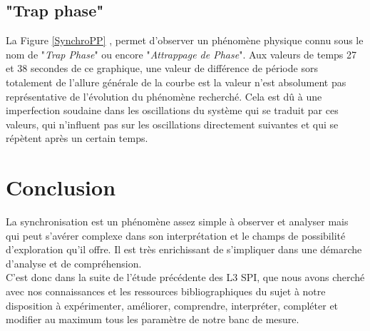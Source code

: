 \documentclass[a4paper,11pt]{report}
\begin{document}
\section{"Trap phase"}
La Figure \ref{SynchroPP} , permet d'observer un phénomène physique connu sous le nom de "{\it Trap Phase}" ou encore "{\it Attrappage de Phase}". Aux valeurs de temps 27 et 38 secondes de ce graphique, une valeur de différence de période sors totalement de l'allure générale de la courbe est la valeur n'est absolument pas représentative de l'évolution du phénomène recherché. Cela est dû à une imperfection soudaine dans les oscillations du système qui se traduit par ces valeurs, qui n'influent pas sur les oscillations directement suivantes et qui se répètent après un certain temps.
\newpage
\null
\thispagestyle{empty}

\chapter*{Conclusion}
La synchronisation est un phénomène assez simple à observer et analyser mais qui peut s'avérer complexe dans son interprétation et le champs de possibilité d'exploration qu'il offre. Il est très enrichissant de s'impliquer dans une démarche d'analyse et de compréhension.\\

C'est donc dans la suite de l'étude précédente des L3 SPI, que nous avons cherché avec nos connaissances et les ressources bibliographiques du sujet à notre disposition à expérimenter, améliorer, comprendre, interpréter, compléter et modifier au maximum tous les paramètre de notre banc de mesure.\\
\end{document}
